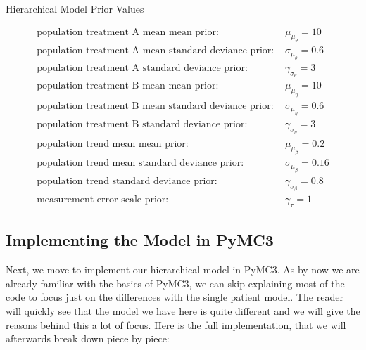 \documentclass[12pt,a4paper,leqno]{report}
\theoremstyle{plain}
\theoremstyle{definition}
\theoremstyle{remark}
\begin{document}
\begin{table}[H]
    \caption{Hierarchical Model Prior Values}\label{hierarchicalmodelpriorvalues}
    \begin{align}\label{}
        \text{population treatment A mean mean prior: } & \mu_{\mu_{\theta}} = 10 \nonumber \\
        \text{population treatment A mean standard deviance prior: } & \sigma_{\mu_{\theta}} = 0.6 \nonumber \\
        \text{population treatment A standard deviance prior: } & \gamma_{\sigma_{\theta}} = 3 \nonumber \\
        \text{population treatment B mean mean prior: } & \mu_{\mu_{\eta}} = 10 \nonumber \\
        \text{population treatment B mean standard deviance prior: } & \sigma_{\mu_{\eta}} = 0.6 \nonumber \\
        \text{population treatment B standard deviance prior: } & \gamma_{\sigma_{\eta}} = 3 \nonumber \\
        \text{population trend mean mean prior: } & \mu_{\mu_{\beta}} = 0.2 \nonumber \\
        \text{population trend mean standard deviance prior: } & \sigma_{\mu_{\beta}} = 0.16 \nonumber \\
        \text{population trend standard deviance prior: } & \gamma_{\sigma_{\beta}} = 0.8 \nonumber \\
        \text{measurement error scale prior: } & \gamma_{\tau} = 1 \nonumber
    \end{align}
\end{table}

\subsection{Implementing the Model in PyMC3}

Next, we move to implement our hierarchical model in PyMC3. As by now we are already
familiar with the basics of PyMC3, we can skip explaining most of the code to focus
just on the differences with the single patient model. The reader will quickly
see that the model we have here is quite different and we will give the reasons behind this a lot of focus. Here is the full
implementation, that we will afterwards break down piece by piece:
\end{document}
